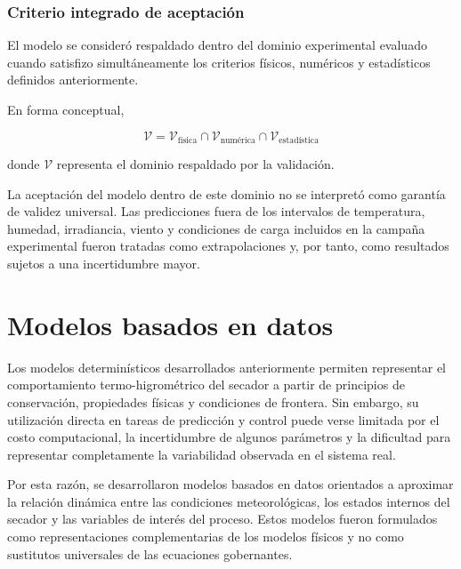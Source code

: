 \subsubsection{Criterio integrado de aceptación}
\label{subsubsec:criterio_aceptacion}

El modelo se consideró respaldado dentro del dominio experimental evaluado cuando satisfizo simultáneamente los criterios físicos, numéricos y estadísticos definidos anteriormente.

En forma conceptual,

\begin{equation}
\boxed{
\mathcal{V}
=
\mathcal{V}_{\mathrm{física}}
\cap
\mathcal{V}_{\mathrm{numérica}}
\cap
\mathcal{V}_{\mathrm{estadística}}
}
\label{eq:validacion_integrada}
\end{equation}

donde $\mathcal{V}$ representa el dominio respaldado por la validación.

La aceptación del modelo dentro de este dominio no se interpretó como garantía de validez universal. Las predicciones fuera de los intervalos de temperatura, humedad, irradiancia, viento y condiciones de carga incluidos en la campaña experimental fueron tratadas como extrapolaciones y, por tanto, como resultados sujetos a una incertidumbre mayor.

\section{Modelos basados en datos}
\label{sec:modelos_data_driven}

Los modelos determinísticos desarrollados anteriormente permiten representar el comportamiento termo-higrométrico del secador a partir de principios de conservación, propiedades físicas y condiciones de frontera. Sin embargo, su utilización directa en tareas de predicción y control puede verse limitada por el costo computacional, la incertidumbre de algunos parámetros y la dificultad para representar completamente la variabilidad observada en el sistema real.

Por esta razón, se desarrollaron modelos basados en datos orientados a aproximar la relación dinámica entre las condiciones meteorológicas, los estados internos del secador y las variables de interés del proceso. Estos modelos fueron formulados como representaciones complementarias de los modelos físicos y no como sustitutos universales de las ecuaciones gobernantes.

